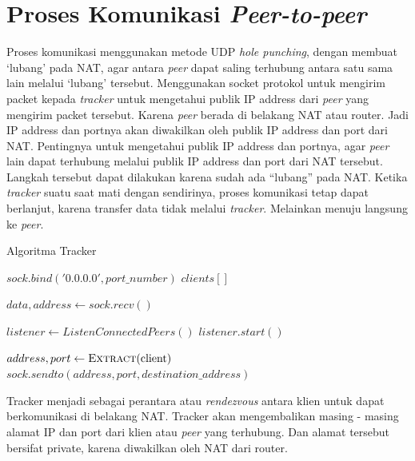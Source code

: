 \section{Proses Komunikasi \emph{Peer-to-peer}}

Proses komunikasi menggunakan metode UDP \emph{hole punching}, dengan membuat `lubang' pada NAT, agar antara \emph{peer} dapat saling terhubung antara satu sama lain melalui `lubang' tersebut. Menggunakan socket protokol untuk mengirim packet kepada \emph{tracker} untuk mengetahui publik IP address dari \emph{peer} yang mengirim packet tersebut. Karena \emph{peer} berada di belakang NAT atau router. Jadi IP address dan portnya akan diwakilkan oleh publik IP address dan port dari NAT. Pentingnya untuk mengetahui publik IP address dan portnya, agar \emph{peer} lain dapat terhubung melalui publik IP address dan port dari NAT tersebut. Langkah tersebut dapat dilakukan karena sudah ada “lubang” pada NAT. Ketika \emph{tracker} suatu saat mati dengan sendirinya, proses komunikasi tetap dapat berlanjut, karena transfer data tidak melalui \emph{tracker}. Melainkan menuju langsung ke \emph{peer}.

\begin{algorithm}[H]
  \caption{Algoritma Tracker}\label{alg:peer-to-peer}
  \begin{algorithmic}
    \State $sock.bind('0.0.0.0', port\_number)$  
    \State $clients[]$ 

    \item[] %

        \State $data, address \gets sock.recv()$ 
        \State {}
      \EndWhile
    \EndFunction

    \item[] %

    \State $listener \gets ListenConnectedPeers()$
    \State $listener.start()$

    \item[] %

      \State $address, port \gets \Call{Extract}{$client$} $ 
      \State $sock.sendto(address, port, destination\_address)$
    \EndFor
  \end{algorithmic}
\end{algorithm}

Tracker menjadi sebagai perantara atau \emph{rendezvous} antara klien untuk dapat berkomunikasi di belakang NAT. Tracker akan mengembalikan masing - masing alamat IP dan port dari klien atau \emph{peer} yang terhubung. Dan alamat tersebut bersifat private, karena diwakilkan oleh NAT dari router.


